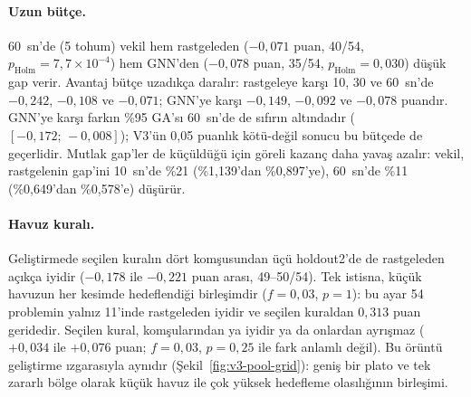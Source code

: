 \documentclass[pdflatex,sn-basic]{sn-jnl}
\begin{document}
\paragraph{Uzun bütçe.}
60~sn'de (5 tohum) vekil hem rastgeleden ($-0{,}071$ puan, 40/54, $p_{\mathrm{Holm}}=7{,}7\times10^{-4}$)
hem GNN'den ($-0{,}078$ puan, 35/54, $p_{\mathrm{Holm}}=0{,}030$) düşük gap verir.
Avantaj bütçe uzadıkça daralır: rastgeleye karşı 10, 30 ve 60~sn'de $-0{,}242$, $-0{,}108$ ve
$-0{,}071$; GNN'ye karşı $-0{,}149$, $-0{,}092$ ve $-0{,}078$ puandır.
GNN'ye karşı farkın \%95 GA'sı 60~sn'de de sıfırın altındadır ($[-0{,}172;\,-0{,}008]$); V3'ün
0,05 puanlık kötü-değil sonucu bu bütçede de geçerlidir.
Mutlak gap'ler de küçüldüğü için göreli kazanç daha yavaş azalır: vekil, rastgelenin gap'ini 10~sn'de
\%21 (\%1,139'dan \%0,897'ye), 60~sn'de \%11 (\%0,649'dan \%0,578'e) düşürür.

\paragraph{Havuz kuralı.}
Geliştirmede seçilen kuralın dört komşusundan üçü holdout2'de de rastgeleden açıkça iyidir
($-0{,}178$ ile $-0{,}221$ puan arası, 49--50/54).
Tek istisna, küçük havuzun her kesimde hedeflendiği birleşimdir ($f=0{,}03$, $p=1$): bu ayar
54 problemin yalnız 11'inde rastgeleden iyidir ve seçilen kuraldan $0{,}313$ puan geridedir.
Seçilen kural, komşularından ya iyidir ya da onlardan ayrışmaz ($+0{,}034$ ile $+0{,}076$ puan;
$f=0{,}03$, $p=0{,}25$ ile fark anlamlı değil).
Bu örüntü geliştirme ızgarasıyla aynıdır (Şekil~\ref{fig:v3-pool-grid}): geniş bir plato ve tek
zararlı bölge olarak küçük havuz ile çok yüksek hedefleme olasılığının birleşimi.
\end{document}

